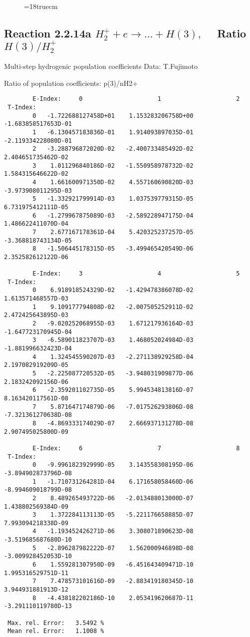 \begin{figure} \label{2.2.5e}
\epsfxsize=18truecm
\end{figure}
\newpage

\subsection{
Reaction 2.2.14a $ H_2^+ + e \rightarrow ...+ H(3) , \quad $
Ratio $H(3)/H_2^+ $
}

 Multi-step hydrogenic population coefficients
 Data: T.Fujimoto

 Ratio of population coefficients: p(3)/nH2+


\begin{verbatim}
        E-Index:     0                     1                     2
 T-Index:
        0   -1.722688127458D+01    1.153283206758D+00   -1.683858517653D-01
        1   -6.130457183836D-01    1.914093897035D-01   -2.119334228080D-01
        2   -3.288796872020D-02   -2.400733485492D-02    2.404651735462D-02
        3    1.011296840186D-02   -1.550958978732D-02    1.584315646622D-02
        4    1.661600971350D-02    4.557160690820D-03   -3.973908011295D-03
        5   -1.332921799914D-03    1.037539779315D-05    6.731975412111D-05
        6   -1.279967875089D-03   -2.589228947175D-04    1.486622411070D-04
        7    2.677167178361D-04    5.420325237257D-05   -3.368818743134D-05
        8   -1.506445178315D-05   -3.499465420549D-06    2.352582612122D-06

        E-Index:     3                     4                     5
 T-Index:
        0    6.918918524329D-02   -1.429478386078D-02    1.613571468557D-03
        1    9.109177794808D-02   -2.007505252911D-02    2.472425643895D-03
        2   -9.020252068955D-03    1.671217936164D-03   -1.647723170945D-04
        3   -6.589011823707D-03    1.468052024984D-03   -1.881996632423D-04
        4    1.324545590207D-03   -2.271138929258D-04    2.197082919209D-05
        5   -2.225087720532D-05   -3.948031909877D-06    2.183242092156D-06
        6   -2.359201102735D-05    5.994534813816D-07    8.163420117561D-08
        7    5.871647174879D-06   -7.017526293806D-08   -7.321361270638D-08
        8   -4.869333174029D-07    2.666937131278D-08    2.907495025800D-09

        E-Index:     6                     7                     8
 T-Index:
        0   -9.996182392999D-05    3.143558308195D-06   -3.894902873796D-08
        1   -1.710731264281D-04    6.171658058460D-06   -8.994609018799D-08
        2    8.489265493722D-06   -2.013488013000D-07    1.438802569384D-09
        3    1.372284113113D-05   -5.221176658885D-07    7.993094218338D-09
        4   -1.193452426271D-06    3.308071890623D-08   -3.519685687680D-10
        5   -2.896287982222D-07    1.562000946898D-08   -3.009928452053D-10
        6    1.559281307950D-09   -6.451643409471D-10    1.995316529751D-11
        7    7.478573101616D-09   -2.883419180345D-10    3.944931881913D-12
        8   -4.438182202186D-10    2.053419620687D-11   -3.291110119780D-13

 Max. rel. Error:   3.5492 %
 Mean rel. Error:   1.1008 %


\end{verbatim}
